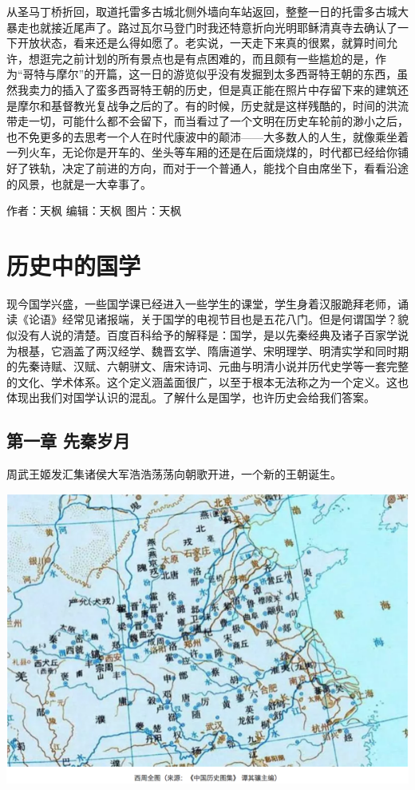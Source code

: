 \documentclass[]{book}
\begin{document}
从圣马丁桥折回，取道托雷多古城北侧外墙向车站返回，整整一日的托雷多古城大暴走也就接近尾声了。路过瓦尔马登门时我还特意折向光明耶稣清真寺去确认了一下开放状态，看来还是么得如愿了。老实说，一天走下来真的很累，就算时间允许，想逛完之前计划的所有景点也是有点困难的，而且颇有一些尴尬的是，作为``哥特与摩尔''的开篇，这一日的游览似乎没有发掘到太多西哥特王朝的东西，虽然我卖力的插入了蛮多西哥特王朝的历史，但是真正能在照片中存留下来的建筑还是摩尔和基督教光复战争之后的了。有的时候，历史就是这样残酷的，时间的洪流带走一切，可能什么都不会留下，而当看过了一个文明在历史车轮前的渺小之后，也不免更多的去思考一个人在时代康波中的颠沛------大多数人的人生，就像乘坐着一列火车，无论你是开车的、坐头等车厢的还是在后面烧煤的，时代都已经给你铺好了铁轨，决定了前进的方向，而对于一个普通人，能找个自由席坐下，看看沿途的风景，也就是一大幸事了。

作者：天枫
编辑：天枫
图片：天枫

\hypertarget{ux5386ux53f2ux4e2dux7684ux56fdux5b66}{%
\section{历史中的国学}\label{ux5386ux53f2ux4e2dux7684ux56fdux5b66}}

现今国学兴盛，一些国学课已经进入一些学生的课堂，学生身着汉服跪拜老师，诵读《论语》经常见诸报端，关于国学的电视节目也是五花八门。但是何谓国学？貌似没有人说的清楚。百度百科给予的解释是：国学，是以先秦经典及诸子百家学说为根基，它涵盖了两汉经学、魏晋玄学、隋唐道学、宋明理学、明清实学和同时期的先秦诗赋、汉赋、六朝骈文、唐宋诗词、元曲与明清小说并历代史学等一套完整的文化、学术体系。这个定义涵盖面很广，以至于根本无法称之为一个定义。这也体现出我们对国学认识的混乱。了解什么是国学，也许历史会给我们答案。

\hypertarget{ux7b2cux4e00ux7ae0-ux5148ux79e6ux5c81ux6708}{%
\subsection{第一章 先秦岁月}\label{ux7b2cux4e00ux7ae0-ux5148ux79e6ux5c81ux6708}}

周武王姬发汇集诸侯大军浩浩荡荡向朝歌开进，一个新的王朝诞生。

\includegraphics[width=8.33in]{images/gx1}
\end{document}
